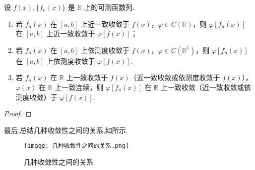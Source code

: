 \documentclass[../../main.tex]{subfiles}
\begin{document}
\begin{theorem}
设 $f(x),\{f_n(x)\}$ 是 $\mathbb{R}$ 上的可测函数列.
\begin{enumerate}[(1)]
\item 若 $f_n(x)$ 在 $[a,b]$ 上近一致收敛于 $f(x)$，$\varphi\in C(\mathbb{R})$，则 $\varphi[f_n(x)]$ 在 $[a,b]$ 上近一致收敛于 $\varphi[f(x)]$；

\item 若 $f_n(x)$ 在 $[a,b]$ 上依测度收敛于 $f(x)$，$\varphi\in C(\mathbb{R}^1)$，则 $\varphi[f_n(x)]$ 在 $[a,b]$ 上依测度收敛于 $\varphi[f(x)]$.

\item 若 $f_n(x)$ 在 $\mathbb{R}$ 上一致收敛于 $f(x)$（近一致收敛或依测度收敛于 $f(x)$），$\varphi(x)$ 在 $\mathbb{R}$ 上一致连续，则 $\varphi[f_n(x)]$ 在 $\mathbb{R}$ 上一致收敛（近一致收敛或依测度收敛）于 $\varphi[f(x)]$. 
\end{enumerate}
\end{theorem}
\begin{proof}

\end{proof}


最后,总结几种收敛性之间的关系,如所示.
\begin{figure}[H]
\centering
\texttt{[image: 几种收敛性之间的关系.png]}
\caption{几种收敛性之间的关系}
\label{image:几种收敛性之间的关系}
\end{figure}
\end{document}
